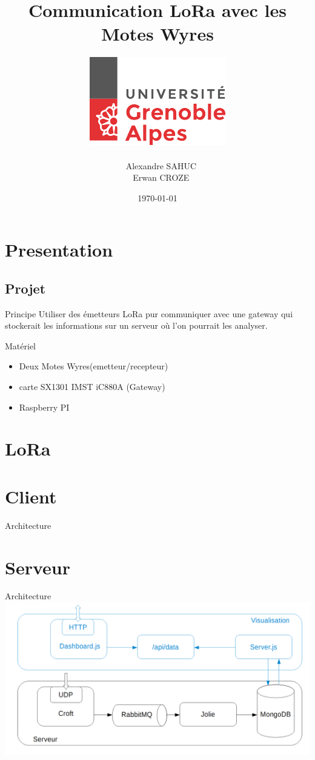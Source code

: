 \documentclass{beamer}
\title{Communication LoRa avec les Motes Wyres}
\author{\includegraphics[scale=0.3]{univ.png} \\~ \\ ~ Alexandre SAHUC\\~ Erwan CROZE}
\institute{Université Joseph Fourier \newline M2M}
\date{\today}
\begin{document}
\begin{frame}
	\titlepage
\end{frame}

\section{Presentation}
\subsection{Projet}
\begin{frame}
  	\begin{block}{Principe}
  		Utiliser des émetteurs LoRa pur communiquer avec une gateway qui stockerait les informations sur un serveur où l'on pourrait les analyser.
	\end{block}
	
	\begin{exampleblock}{Matériel}
		\begin{itemize}
			\item Deux Motes Wyres(emetteur/recepteur)
			\item carte SX1301 IMST iC880A (Gateway)
			\item Raspberry PI 
		\end{itemize}			
	\end{exampleblock}
\end{frame}

\section{LoRa}
\begin{frame}

\end{frame}

\section{Client}
\begin{frame}
	\begin{block}{Architecture}
	\end{block}
\end{frame}

\section{Serveur}
\begin{frame}{Architecture}
	\includegraphics[scale=0.3]{M2M.png}
\end{frame}
\end{document}
